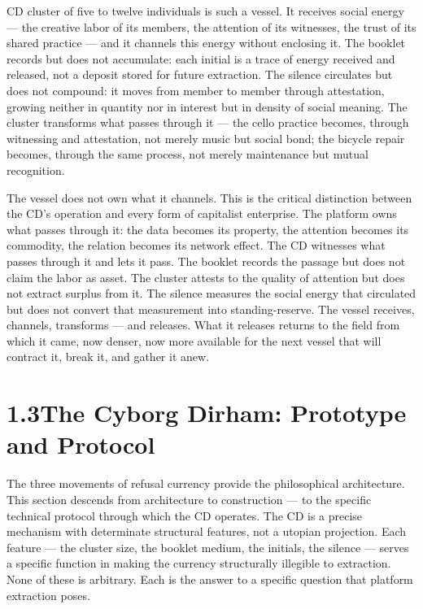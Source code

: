CD cluster of five to twelve individuals is such a vessel. It receives social energy — the creative labor of its members, the attention of its witnesses, the trust of its shared practice — and it channels this energy without enclosing it. The booklet records but does not accumulate: each initial is a trace of energy received and released, not a deposit stored for future extraction. The silence circulates but does not compound: it moves from member to member through attestation, growing neither in quantity nor in interest but in density of social meaning. The cluster transforms what passes through it — the cello practice becomes, through witnessing and attestation, not merely music but social bond; the bicycle repair becomes, through the same process, not merely maintenance but mutual recognition.

The vessel does not own what it channels. This is the critical distinction between the CD’s operation and every form of capitalist enterprise. The platform owns what passes through it: the data becomes its property, the attention becomes its commodity, the relation becomes its network effect. The CD witnesses what passes through it and lets it pass. The booklet records the passage but does not claim the labor as asset. The cluster attests to the quality of attention but does not extract surplus from it. The silence measures the social energy that circulated but does not convert that measurement into standing-reserve. The vessel receives, channels, transforms — and releases. What it releases returns to the field from which it came, now denser, now more available for the next vessel that will contract it, break it, and gather it anew.

\section{1.3\quad The Cyborg Dirham: Prototype and Protocol}

The three movements of refusal currency provide the philosophical architecture. This section descends from architecture to construction — to the specific technical protocol through which the CD operates. The CD is a precise mechanism with determinate structural features, not a utopian projection. Each feature — the cluster size, the booklet medium, the initials, the silence — serves a specific function in making the currency structurally illegible to extraction. None of these is arbitrary. Each is the answer to a specific question that platform extraction poses.

